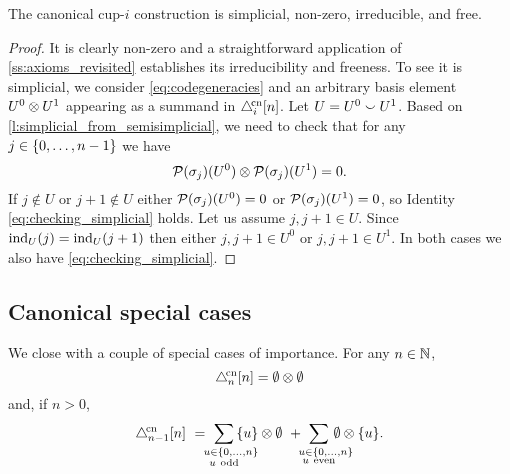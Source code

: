 \begin{theorem}\label{t:existence}
	The canonical \mbox{cup-$i$} construction is simplicial, non-zero, irreducible, and free.
\end{theorem}

\begin{proof}
	It is clearly non-zero and a straightforward application of \cref{ss:axioms_revisited} establishes its irreducibility and freeness.
	To see it is simplicial, we consider \cref{eq:codegeneracies} and an arbitrary basis element $U^0 \otimes U^1$ appearing as a summand in $\triangle^{\!\mathrm{cn}}_i[n]$.
	Let $U = U^0 \union U^1$.
	Based on \cref{l:simplicial_from_semisimplicial}, we need to check that for any $j \in \{0,\dots,n-1\}$ we have
	\begin{equation}\label{eq:checking_simplicial}
		\mathcal{P}(\sigma_j)(U^0) \otimes \mathcal{P}(\sigma_j)(U^1) = 0.
	\end{equation}
	If $j \notin U$ or $j+1 \notin U$ either $\mathcal{P}(\sigma_j)(U^0) = 0$ or $\mathcal{P}(\sigma_j)(U^1) = 0$, so Identity \eqref{eq:checking_simplicial} holds.
	Let us assume $j,j+1 \in U$.
	Since $\operatorname{ind}_U(j) = \operatorname{ind}_U(j+1)$ then either $j,j+1 \in U^0$ or $j,j+1 \in U^1$.
	In both cases we also have \eqref{eq:checking_simplicial}.
\end{proof}

\subsection{Canonical special cases}

We close with a couple of special cases of importance.
For any $n \in \mathbb{N}$,
\[
\triangle^{\!\mathrm{cn}}_n[n] = \emptyset \otimes \emptyset
\]
and, if $n > 0$,
\[
\canonical_{n-1} [n] \ = \
\sum_{\mathclap{\substack{\quad u \in \{0,\dots,n\} \\ u \ \mathrm{odd}}}} \,\{u\} \ot \emptyset \ + \
\sum_{\mathclap{\substack{\quad u \in \{0,\dots,n\} \\ u \ \mathrm{even}}}} \,\emptyset \ot \{u\}.
\]